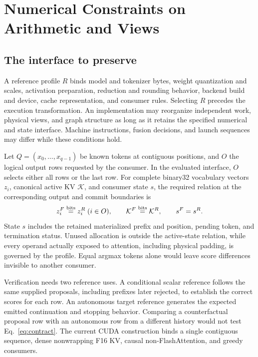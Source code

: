 \section{Numerical Constraints on Arithmetic and Views}
\label{sec:reference}

\subsection{The interface to preserve}
A reference profile $R$ binds model and tokenizer bytes, weight quantization and scales, activation preparation, reduction and rounding behavior, backend build and device, cache representation, and consumer rules. Selecting $R$ precedes the execution transformation. An implementation may reorganize independent work, physical views, and graph structure as long as it retains the specified numerical and state interface. Machine instructions, fusion decisions, and launch sequences may differ while these conditions hold.

Let $Q=(x_0,\ldots,x_{q-1})$ be known tokens at contiguous positions, and $O$ the logical output rows requested by the consumer. In the evaluated interface, $O$ selects either all rows or the last row. For complete binary32 vocabulary vectors $z_i$, canonical active KV $\mathcal K$, and consumer state $s$, the required relation at the corresponding output and commit boundaries is
\begin{equation}
 z_i^F\mathrel{\overset{\mathrm{bits}}{=}} z_i^R\;(i\in O),\qquad
 \mathcal K^F\mathrel{\overset{\mathrm{bits}}{=}}\mathcal K^R,\qquad s^F=s^R.
 \label{eq:contract}
\end{equation}
State $s$ includes the retained materialized prefix and position, pending token, and termination status. Unused allocation is outside the active-state relation, while every operand actually exposed to attention, including physical padding, is governed by the profile. Equal argmax tokens alone would leave score differences invisible to another consumer.

Verification needs two reference uses. A conditional scalar reference follows the same supplied proposals, including prefixes later rejected, to establish the correct scores for each row. An autonomous target reference generates the expected emitted continuation and stopping behavior. Comparing a counterfactual proposal row with an autonomous row from a different history would not test Eq.~\eqref{eq:contract}. The current CUDA construction binds a single contiguous sequence, dense nonwrapping F16 KV, causal non-FlashAttention, and greedy consumers.

